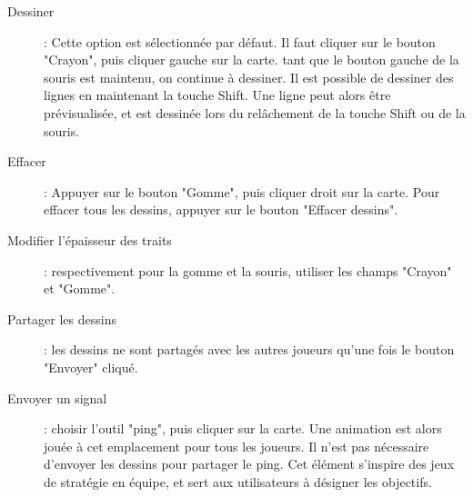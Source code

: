 \begin{description}
	\item[Dessiner]: Cette option est sélectionnée par défaut. Il faut cliquer sur le bouton "Crayon", puis cliquer gauche sur la carte. tant que le bouton gauche de la souris est maintenu, on continue à dessiner. Il est possible de dessiner des lignes en maintenant la touche Shift. Une ligne peut alors être prévisualisée, et est dessinée lors du relâchement de la touche Shift ou de la souris.
	\item[Effacer]: Appuyer sur le bouton "Gomme", puis cliquer droit sur la carte. Pour effacer tous les dessins, appuyer sur le bouton "Effacer dessins".
	\item[Modifier l'épaisseur des traits]: respectivement pour la gomme et la souris, utiliser les champs "Crayon" et "Gomme".
	\item[Partager les dessins]: les dessins ne sont partagés avec les autres joueurs qu'une fois le bouton "Envoyer" cliqué.
	\item[Envoyer un signal]: choisir l'outil "ping", puis cliquer sur la carte. Une animation est alors jouée à cet emplacement pour tous les joueurs. Il n'est pas nécessaire d'envoyer les dessins pour partager le ping. Cet élément s'inspire des jeux de stratégie en équipe, et sert aux utilisateurs à désigner les objectifs.
\end{description}




